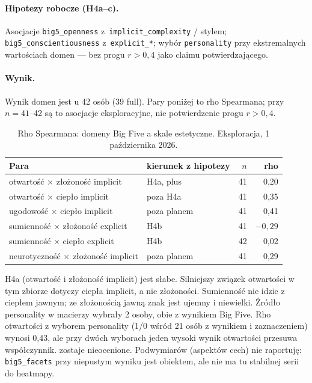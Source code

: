 \paragraph{Hipotezy robocze (H4a--c).}
Asocjacje \texttt{big5\_openness} z~\texttt{implicit\_complexity} / stylem; \texttt{big5\_conscientiousness} z~\texttt{explicit\_*}; wybór \texttt{personality} przy ekstremalnych wartościach domen --- bez progu $r\!>\!0{,}4$ jako claimu potwierdzającego.

\paragraph{Wynik.}
Wynik domen jest u 42 osób (39 full). Pary poniżej to rho Spearmana; przy $n=41$--42 są to asocjacje eksploracyjne, nie potwierdzenie progu $r>0{,}4$.

\begin{table}[htbp]
  \centering
  \small
  \caption{Rho Spearmana: domeny Big Five a skale estetyczne. Eksploracja, 1 października 2026.}
  \label{tab:ch08:big5}
  \begin{tabular}{llrr}
    \toprule
    Para & kierunek z hipotezy & $n$ & rho \\
    \midrule
    otwartość $\times$ złożoność implicit & H4a, plus & 41 & 0,20 \\
    otwartość $\times$ ciepło implicit & poza H4a & 41 & 0,35 \\
    ugodowość $\times$ ciepło implicit & poza planem & 41 & 0,41 \\
    sumienność $\times$ złożoność explicit & H4b & 41 & $-0{,}29$ \\
    sumienność $\times$ ciepło explicit & H4b & 42 & 0,02 \\
    neurotyczność $\times$ złożoność implicit & poza planem & 41 & 0,29 \\
    \bottomrule
  \end{tabular}
\end{table}

\noindent
H4a (otwartość i złożoność implicit) jest słabe. Silniejszy związek otwartości w tym zbiorze dotyczy ciepła implicit, a nie złożoności. Sumienność nie idzie z ciepłem jawnym; ze złożonością jawną znak jest ujemny i niewielki.
Źródło personality w macierzy wybrały 2 osoby, obie z wynikiem Big Five. Rho otwartości z wyborem personality (1/0 wśród 21 osób z wynikiem i zaznaczeniem) wynosi 0,43, ale przy dwóch wyborach jeden wysoki wynik otwartości przesuwa współczynnik.  zostaje nieocenione.
Podwymiarów (aspektów cech) nie raportuję: \texttt{big5\_facets} przy niepustym wyniku jest obiektem, ale nie ma tu stabilnej serii do heatmapy.

